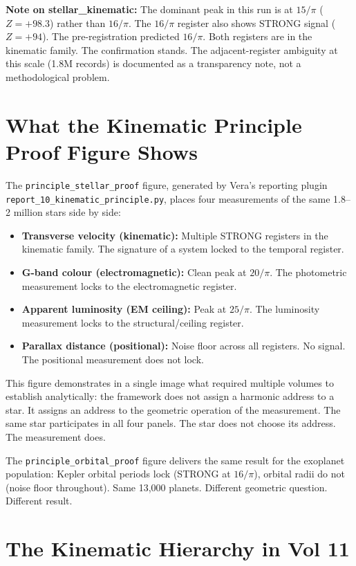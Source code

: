 \documentclass[11pt, letterpaper, openany]{book}
\begin{document}
\begin{empiricalbox}
\textbf{Note on stellar\_kinematic:} The dominant peak in this run is at $15/\pi$
($Z = +98.3$) rather than $16/\pi$. The $16/\pi$ register also shows STRONG
signal ($Z = +94$). The pre-registration predicted $16/\pi$. Both registers
are in the kinematic family. The confirmation stands. The
adjacent-register ambiguity at this scale (1.8M records) is documented
as a transparency note, not a methodological problem.

\section{What the Kinematic Principle Proof Figure Shows}

The \texttt{principle\_stellar\_proof} figure, generated by Vera's reporting
plugin \texttt{report\_10\_kinematic\_principle.py}, places four measurements
of the same 1.8--2 million stars side by side:

\begin{itemize}
\item \textbf{Transverse velocity (kinematic):} Multiple STRONG registers in
  the kinematic family. The signature of a system locked to the temporal
  register.
\item \textbf{G-band colour (electromagnetic):} Clean peak at $20/\pi$. The
  photometric measurement locks to the electromagnetic register.
\item \textbf{Apparent luminosity (EM ceiling):} Peak at $25/\pi$. The
  luminosity measurement locks to the structural/ceiling register.
\item \textbf{Parallax distance (positional):} Noise floor across all registers.
  No signal. The positional measurement does not lock.
\end{itemize}

This figure demonstrates in a single image what required multiple volumes to
establish analytically: the framework does not assign a harmonic address to
a star. It assigns an address to the geometric operation of the measurement.
The same star participates in all four panels. The star does not choose its
address. The measurement does.

The \texttt{principle\_orbital\_proof} figure delivers the same result for the
exoplanet population: Kepler orbital periods lock (STRONG at $16/\pi$),
orbital radii do not (noise floor throughout). Same 13,000 planets. Different
geometric question. Different result.

\section{The Kinematic Hierarchy in Vol 11}


\end{empiricalbox}
\end{document}
